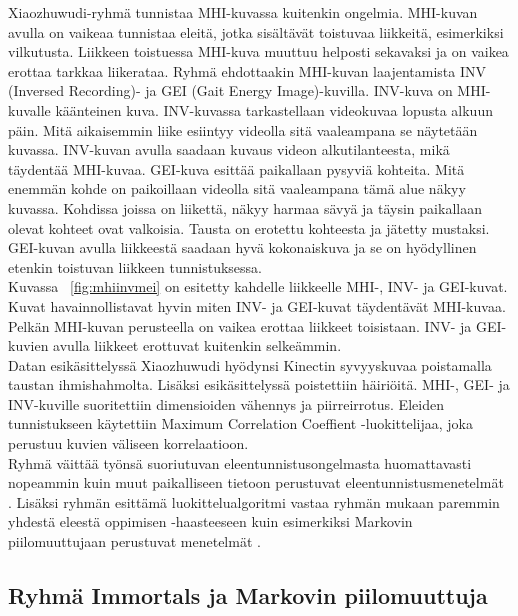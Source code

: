 Xiaozhuwudi-ryhmä tunnistaa MHI-kuvassa kuitenkin ongelmia. MHI-kuvan avulla on vaikeaa tunnistaa eleitä, jotka sisältävät toistuvaa liikkeitä, 
esimerkiksi vilkutusta.
Liikkeen toistuessa MHI-kuva muuttuu helposti sekavaksi ja on vaikea erottaa tarkkaa liikerataa. Ryhmä ehdottaakin MHI-kuvan laajentamista 
INV (Inversed Recording)- ja GEI (Gait Energy Image)-kuvilla. INV-kuva on MHI-kuvalle käänteinen kuva. INV-kuvassa tarkastellaan videokuvaa lopusta alkuun päin.
Mitä aikaisemmin liike esiintyy videolla sitä vaaleampana se näytetään kuvassa. INV-kuvan avulla saadaan kuvaus videon alkutilanteesta, mikä täydentää MHI-kuvaa. 
GEI-kuva esittää paikallaan pysyviä kohteita. Mitä enemmän kohde on paikoillaan videolla sitä vaaleampana tämä alue näkyy kuvassa.
Kohdissa joissa on liikettä, näkyy harmaa sävyä ja täysin paikallaan olevat kohteet ovat valkoisia. Tausta on erotettu kohteesta ja jätetty mustaksi. 
GEI-kuvan avulla liikkeestä saadaan hyvä kokonaiskuva ja se on hyödyllinen etenkin toistuvan liikkeen tunnistuksessa. \citep {6239179} \\

Kuvassa ~\ref{fig:mhiinvmei} on esitetty kahdelle
liikkeelle MHI-, INV- ja GEI-kuvat. Kuvat havainnollistavat hyvin miten INV- ja GEI-kuvat
täydentävät MHI-kuvaa. Pelkän MHI-kuvan perusteella on vaikea erottaa liikkeet toisistaan.
INV- ja GEI-kuvien avulla liikkeet erottuvat kuitenkin selkeämmin. \\

Datan esikäsittelyssä Xiaozhuwudi hyödynsi Kinectin syvyyskuvaa poistamalla taustan ihmishahmolta. Lisäksi esikäsittelyssä poistettiin häiriöitä.
MHI-, GEI- ja INV-kuville suoritettiin dimensioiden vähennys ja piirreirrotus. Eleiden tunnistukseen käytettiin Maximum Correlation Coeffient -luokittelijaa,
joka perustuu kuvien väliseen korrelaatioon. \citep{6239179}\\

Ryhmä väittää työnsä suoriutuvan eleentunnistusongelmasta huomattavasti nopeammin kuin muut paikalliseen tietoon perustuvat eleentunnistusmenetelmät \citep{firstround}.
Lisäksi ryhmän esittämä luokittelualgoritmi vastaa ryhmän mukaan paremmin yhdestä eleestä oppimisen -haasteeseen kuin esimerkiksi Markovin piilomuuttujaan perustuvat menetelmät
\citep{6239179}.

\subsection{Ryhmä Immortals ja Markovin piilomuuttuja}

